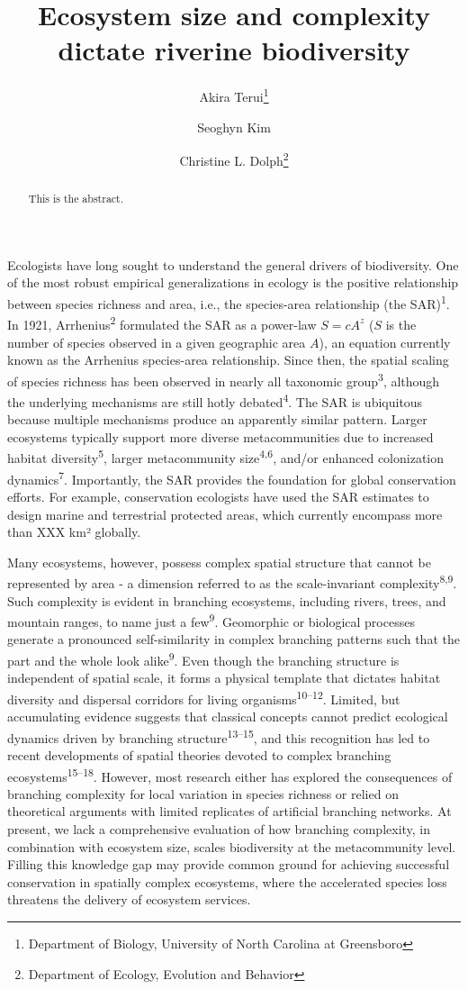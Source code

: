 \documentclass[
]{article}
\title{Ecosystem size and complexity dictate riverine biodiversity}
\author{Akira Terui\footnote{Department of Biology, University of North
  Carolina at Greensboro} \and Seoghyn
Kim\footnotemark[1] \and Christine L. Dolph\footnote{Department of
  Ecology, Evolution and Behavior}}
\date{}
\begin{document}
\maketitle
\begin{abstract}
\textbar This is the abstract.
\end{abstract}

Ecologists have long sought to understand the general drivers of
biodiversity. One of the most robust empirical generalizations in
ecology is the positive relationship between species richness and area,
i.e., the species-area relationship (the SAR)\textsuperscript{1}. In
1921, Arrhenius\textsuperscript{2} formulated the SAR as a power-law
\(S = cA^z\) (\(S\) is the number of species observed in a given
geographic area \(A\)), an equation currently known as the Arrhenius
species-area relationship. Since then, the spatial scaling of species
richness has been observed in nearly all taxonomic
group\textsuperscript{3}, although the underlying mechanisms are still
hotly debated\textsuperscript{4}. The SAR is ubiquitous because multiple
mechanisms produce an apparently similar pattern. Larger ecosystems
typically support more diverse metacommunities due to increased habitat
diversity\textsuperscript{5}, larger metacommunity
size\textsuperscript{4,6}, and/or enhanced colonization
dynamics\textsuperscript{7}. Importantly, the SAR provides the
foundation for global conservation efforts. For example, conservation
ecologists have used the SAR estimates to design marine and terrestrial
protected areas, which currently encompass more than XXX km² globally.

Many ecosystems, however, possess complex spatial structure that cannot
be represented by area - a dimension referred to as the scale-invariant
complexity\textsuperscript{8,9}. Such complexity is evident in branching
ecosystems, including rivers, trees, and mountain ranges, to name just a
few\textsuperscript{9}. Geomorphic or biological processes generate a
pronounced self-similarity in complex branching patterns such that the
part and the whole look alike\textsuperscript{9}. Even though the
branching structure is independent of spatial scale, it forms a physical
template that dictates habitat diversity and dispersal corridors for
living organisms\textsuperscript{10--12}. Limited, but accumulating
evidence suggests that classical concepts cannot predict ecological
dynamics driven by branching structure\textsuperscript{13--15}, and this
recognition has led to recent developments of spatial theories devoted
to complex branching ecosystems\textsuperscript{15--18}. However, most
research either has explored the consequences of branching complexity
for local variation in species richness or relied on theoretical
arguments with limited replicates of artificial branching networks. At
present, we lack a comprehensive evaluation of how branching complexity,
in combination with ecosystem size, scales biodiversity at the
metacommunity level. Filling this knowledge gap may provide common
ground for achieving successful conservation in spatially complex
ecosystems, where the accelerated species loss threatens the delivery of
ecosystem services.
\end{document}
